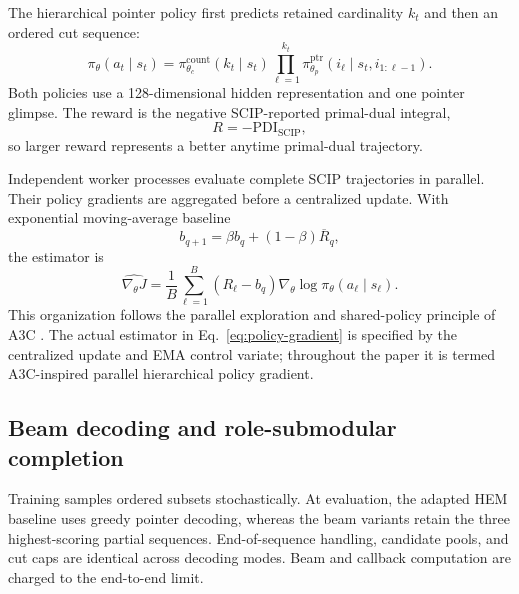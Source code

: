 \documentclass[preprint,12pt,authoryear]{elsarticle}
\newcommand{\pdi}{\mathrm{PDI}}
\begin{document}
The hierarchical pointer policy \citep{vinyals2015pointer,wang2023hem} first
predicts retained cardinality $k_t$ and then an ordered cut sequence:
\begin{equation}
 \pi_\theta(a_t\mid s_t)=
 \pi_{\theta_c}^{\mathrm{count}}(k_t\mid s_t)
 \prod_{\ell=1}^{k_t}
 \pi_{\theta_p}^{\mathrm{ptr}}
 (i_\ell\mid s_t,i_{1:\ell-1}).
 \label{eq:hierarchical-policy}
\end{equation}
Both policies use a 128-dimensional hidden representation and one pointer
glimpse. The reward is the negative SCIP-reported primal-dual integral,
\begin{equation}
 R=-\pdi_{\mathrm{SCIP}},
 \label{eq:reward}
\end{equation}
so larger reward represents a better anytime primal-dual trajectory.

Independent worker processes evaluate complete SCIP trajectories in parallel.
Their policy gradients are aggregated before a centralized update. With
exponential moving-average baseline
\begin{equation}
 b_{q+1}=\beta b_q+(1-\beta)\overline R_q,
 \label{eq:ema}
\end{equation}
the estimator is
\begin{equation}
 \widehat{\nabla_\theta J}=
 \frac{1}{B}\sum_{\ell=1}^{B}
 (R_\ell-b_q)\nabla_\theta
 \log\pi_\theta(a_\ell\mid s_\ell).
 \label{eq:policy-gradient}
\end{equation}
This organization follows the parallel exploration and shared-policy
principle of A3C \citep{mnih2016a3c}. The actual estimator in
Eq.~\eqref{eq:policy-gradient} is specified by the centralized update and EMA
control variate; throughout the paper it is termed A3C-inspired parallel
hierarchical policy gradient.

\subsection{Beam decoding and role-submodular completion}

Training samples ordered subsets stochastically. At evaluation, the adapted
HEM baseline uses greedy pointer decoding, whereas the beam variants retain
the three highest-scoring partial sequences. End-of-sequence handling,
candidate pools, and cut caps are identical across decoding modes. Beam and
callback computation are charged to the end-to-end limit.
\end{document}
